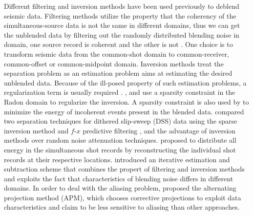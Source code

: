 Different filtering and inversion methods have been used previously to deblend seismic data. Filtering methods utilize the property that the coherency of the simultaneous-source data is not the same in different domains, thus we can get the unblended data by filtering out the randomly distributed blending noise in  domain,  one source record is coherent and the other is not \cite[]{gary,araz2012,mediandeblend}. One choice is to transform seismic data from the common-shot domain to common-receiver, common-offset or common-midpoint domain. Inversion methods treat the separation problem as an estimation problem  aims at estimating the desired  unblended data. Because of the ill-posed property of such estimation problems, a regularization term is usually required \cite[]{pana2}. \cite{moore2008}, \cite{akerberg2008} and \cite{moore2010} use a sparsity constraint in the Radon domain to regularize the inversion. A sparsity constraint is also used by \cite{abma2010} to minimize the energy of  incoherent events present in the blended data. \cite{bagaini2012} compared two separation techniques for  dithered slip-sweep (DSS) data using the sparse inversion method \cite{moore2010} and  $f$-$x$ predictive filtering \cite[]{canales1984,yangkang2014}, and   the advantage of  inversion methods over  random noise attenuation techniques. \cite{borselen2012} proposed to distribute all energy in the simultaneous shot records by reconstructing the individual shot records at their respective locations. \cite{araz2012} introduced an iterative estimation and subtraction scheme that combines the propert of filtering and inversion methods and exploits the fact that characteristics of  blending noise differs in different domains. In order to deal with the aliasing problem, \cite{proj} proposed the alternating projection method (APM), which chooses corrective projections to exploit data characteristics and  claim to be less sensitive to aliasing than  other approaches. 

